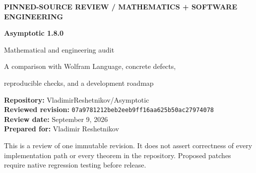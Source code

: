 \documentclass[11pt,a4paper]{article}
\newcommand{\commit}{\texttt{07a9781212beb2eeb9ff16aa625b50ac27974078}}
\theoremstyle{remark}\newtheorem{remark}[proposition]{Remark}
\begin{document}
\thispagestyle{empty}
{\sffamily\small\bfseries\color{teal}PINNED-SOURCE REVIEW \quad / \quad MATHEMATICS + SOFTWARE ENGINEERING\par}
\vspace{1.1cm}
{\sffamily\Huge\bfseries\color{navy}Asymptotic 1.8.0\par}
\vspace{0.25cm}
{\sffamily\LARGE\color{navy}Mathematical and engineering audit\par}
\vspace{0.4cm}
{\large A comparison with Wolfram Language, concrete defects,\par reproducible checks, and a development roadmap\par}
\vspace{0.8cm}
\textbf{Repository:} VladimirReshetnikov/Asymptotic\\
\textbf{Reviewed revision:} \commit\\
\textbf{Review date:} September 9, 2026\\
\textbf{Prepared for:} Vladimir Reshetnikov\par
\vspace{0.65cm}
\begin{abstract}
\noindent
The repository is a substantial, specialized extension to Wolfram Language, not a replacement for its asymptotic engine. Its principal contribution is a reusable representation of selected real asymptotic germs: complete blocks with exact real exponents, explicit error scales, source and target branches, retained computation state, and specialized inverse constructions. Much of its value lies in preserving meaning during subsequent operations rather than merely printing an expansion.

This review traces the central power--logarithmic engine and important surrounding layers, compares the design with current official Wolfram documentation, and identifies four particularly actionable issues: a nested-observable real-branch guard bypass; an unbounded eager dense allocation during optional native export; disclosed loss of logarithmic error information in that export; and use of ambient assumptions without reliably recording their provenance. Other findings concern release validation, resource accounting, heterogeneous cutoff semantics, compatibility, and incomplete closure between supported scales.

The accompanying Python checks establish 42 mathematical and allocation-policy assertions. Six further tests exercise the patch generator on synthetic fixtures. Fifteen prospective Wolfram regression tests and a benchmark harness are supplied, but \emph{no native Wolfram execution was available during this review}. Source deductions, independent checks, repository-reported validation, and unexecuted proposals are distinguished throughout.
\end{abstract}
\vfill
{\small\color{muted}This is a review of one immutable revision. It does not assert correctness of every implementation path or every theorem in the repository. Proposed patches require native regression testing before release.}
\clearpage
\begingroup
\small
\setlength{\parskip}{0pt}
\tableofcontents
\endgroup
\clearpage
\end{document}
